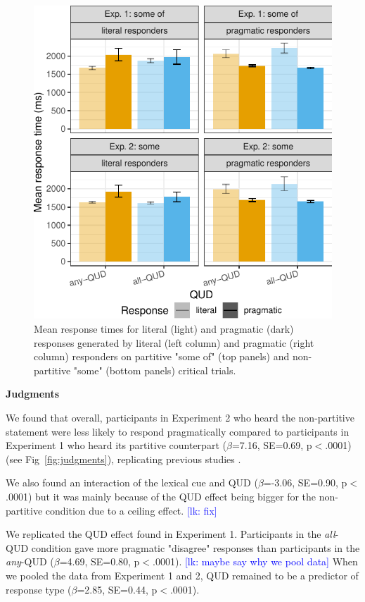 \documentclass[10pt,letterpaper]{article}
\newcommand{\lk}[1]{\textcolor{Blue}{[lk: #1]}}
\begin{document}
\begin{figure}
\centering
  \includegraphics[width=\columnwidth]{plots/responsetimes}
  \caption{Mean response times for literal (light) and pragmatic (dark) responses generated by literal (left column) and pragmatic (right column) responders on partitive "some of" (top panels) and non-partitive "some" (bottom panels) critical trials. }
  \label{fig:responsetimes}
\end{figure}

\noindent \textbf{Judgments}

We found that overall, participants in Experiment 2 who heard the non-partitive statement were less likely to respond pragmatically compared to participants in Experiment 1 who heard its partitive counterpart ($\beta$=7.16, SE=0.69, p$<$.0001)(see Fig~\ref{fig:judgments}), replicating previous studies \cite{DegenTanenhaus2015,Degen2015}.

We also found an interaction of the lexical cue and QUD ($\beta$=-3.06, SE=0.90, p$<$.0001) but it was mainly because of the QUD effect being bigger for the non-partitive condition due to a ceiling effect. \lk{fix}

We replicated the QUD effect found in Experiment 1. Participants in the \textit{all}-QUD condition gave more pragmatic "disagree" responses than participants in the \textit{any}-QUD ($\beta$=4.69, SE=0.80, p$<$.0001). \lk{maybe say why we pool data} When we pooled the data from Experiment 1 and 2, QUD remained to be a predictor of response type ($\beta$=2.85, SE=0.44, p$<$.0001).
\end{document}
